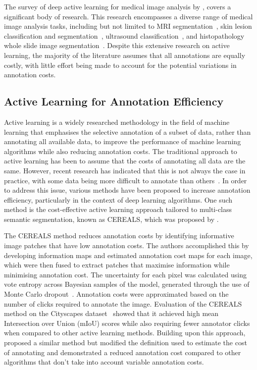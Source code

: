 The survey of deep active learning for medical image analysis by \cite{budd2021survey}, covers a significant body of research. This research encompasses a diverse range of medical image analysis tasks, including but not limited to MRI segmentation~\citep{konyushkova2019geometry,zhao2019data}, skin lesion classification and segmentation~\citep{shi2019active, gorriz2017cost}, ultrasound classification~\cite{liu2020semi}, and histopathology whole slide image segmentation~\citep{folmsbee2021whole, jin2021reducing}. Despite this extensive research on active learning, the majority of the literature assumes that all annotations are equally costly, with little effort being made to account for the potential variations in annotation costs.

\subsection{Active Learning for Annotation Efficiency}
\label{subsec:active_annotation_efficiency}
Active learning is a widely researched methodology in the field of machine learning that emphasises the selective annotation of a subset of data, rather than annotating all available data, to improve the performance of machine learning algorithms while also reducing annotation costs. The traditional approach to active learning has been to assume that the costs of annotating all data are the same. However, recent research has indicated that this is not always the case in practice, with some data being more difficult to annotate than others~\citep{settles2008active2}. In order to address this issue, various methods have been proposed to increase annotation efficiency, particularly in the context of deep learning algorithms. One such method is the cost-effective active learning approach tailored to multi-class semantic segmentation, known as CEREALS, which was proposed by \cite{mackowiak2018cereals}.

The CEREALS method reduces annotation costs by identifying informative image patches that have low annotation costs. The authors accomplished this by developing information maps and estimated annotation cost maps for each image, which were then fused to extract patches that maximise information while minimising annotation cost. The uncertainty for each pixel was calculated using vote entropy across Bayesian samples of the model, generated through the use of Monte Carlo dropout~\citep{gal2016dropout}. Annotation costs were approximated based on the number of clicks required to annotate the image. Evaluation of the CEREALS method on the Cityscapes dataset~\citep{cordts2016cityscapes} showed that it achieved high mean Intersection over Union (mIoU) scores while also requiring fewer annotator clicks when compared to other active learning methods. Building upon this approach, \cite{colling2020metabox} proposed a similar method but modified the definition used to estimate the cost of annotating and demonstrated a reduced annotation cost compared to other algorithms that don’t take into account variable annotation costs.



